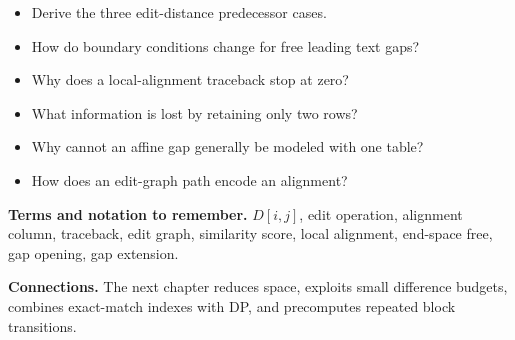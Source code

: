 \documentclass[11pt]{article}
\begin{document}
\begin{tcolorbox}[enhanced,breakable,title={Self-test questions},
  colback=white,colframe=Accent,fonttitle=\small\sffamily\bfseries,fontupper=\footnotesize,
  boxsep=0.6mm,left=1.5mm,right=1.5mm,top=1mm,bottom=1mm,before skip=3pt,after skip=3pt]
\begin{itemize}
  \item Derive the three edit-distance predecessor cases.
  \item How do boundary conditions change for free leading text gaps?
  \item Why does a local-alignment traceback stop at zero?
  \item What information is lost by retaining only two rows?
  \item Why cannot an affine gap generally be modeled with one table?
  \item How does an edit-graph path encode an alignment?
\end{itemize}
\end{tcolorbox}

{\footnotesize
\textbf{Terms and notation to remember.} $D[i,j]$, edit operation, alignment column, traceback, edit graph, similarity score, local alignment, end-space free, gap opening, gap extension.

\textbf{Connections.} The next chapter reduces space, exploits small difference budgets, combines exact-match indexes with DP, and precomputes repeated block transitions.
}
\end{document}
